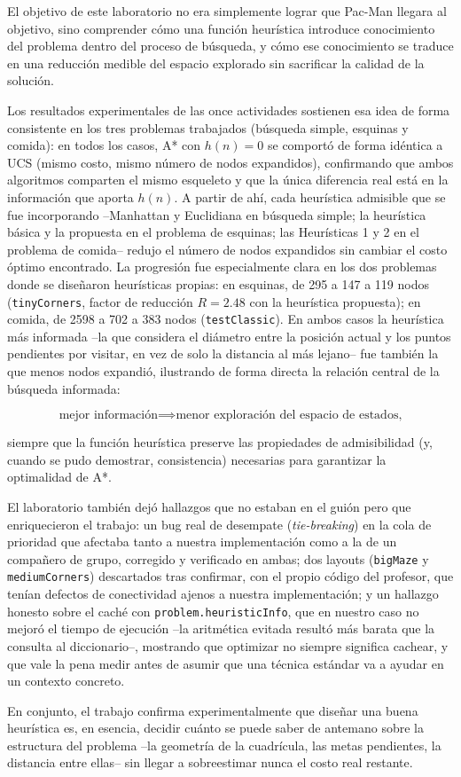El objetivo de este laboratorio no era simplemente lograr que Pac-Man llegara al objetivo, sino
comprender cómo una función heurística introduce conocimiento del problema dentro del proceso de
búsqueda, y cómo ese conocimiento se traduce en una reducción medible del espacio explorado sin
sacrificar la calidad de la solución.

Los resultados experimentales de las once actividades sostienen esa idea de forma consistente en
los tres problemas trabajados (búsqueda simple, esquinas y comida): en todos los casos, A* con
$h(n)=0$ se comportó de forma idéntica a UCS (mismo costo, mismo número de nodos expandidos),
confirmando que ambos algoritmos comparten el mismo esqueleto y que la única diferencia real está
en la información que aporta $h(n)$. A partir de ahí, cada heurística admisible que se fue
incorporando --Manhattan y Euclidiana en búsqueda simple; la heurística básica y la propuesta en el
problema de esquinas; las Heurísticas 1 y 2 en el problema de comida-- redujo el número de nodos
expandidos sin cambiar el costo óptimo encontrado. La progresión fue especialmente clara en los dos
problemas donde se diseñaron heurísticas propias: en esquinas, de 295 a 147 a 119 nodos
(\texttt{tinyCorners}, factor de reducción $R=2.48$ con la heurística propuesta); en comida, de 2598
a 702 a 383 nodos (\texttt{testClassic}). En ambos casos la heurística más informada --la que
considera el diámetro entre la posición actual y los puntos pendientes por visitar, en vez de solo
la distancia al más lejano-- fue también la que menos nodos expandió, ilustrando de forma directa la
relación central de la búsqueda informada:

$$\text{mejor información} \implies \text{menor exploración del espacio de estados,}$$

siempre que la función heurística preserve las propiedades de admisibilidad (y, cuando se pudo
demostrar, consistencia) necesarias para garantizar la optimalidad de A*.

El laboratorio también dejó hallazgos que no estaban en el guión pero que enriquecieron el trabajo:
un bug real de desempate (\textit{tie-breaking}) en la cola de prioridad que afectaba tanto a
nuestra implementación como a la de un compañero de grupo, corregido y verificado en ambas; dos
layouts (\texttt{bigMaze} y \texttt{mediumCorners}) descartados tras confirmar, con el propio código
del profesor, que tenían defectos de conectividad ajenos a nuestra implementación; y un hallazgo
honesto sobre el caché con \texttt{problem.heuristicInfo}, que en nuestro caso no mejoró el tiempo
de ejecución --la aritmética evitada resultó más barata que la consulta al diccionario--, mostrando
que optimizar no siempre significa cachear, y que vale la pena medir antes de asumir que una técnica
estándar va a ayudar en un contexto concreto.

En conjunto, el trabajo confirma experimentalmente que diseñar una buena heurística es, en esencia,
decidir cuánto se puede saber de antemano sobre la estructura del problema --la geometría de la
cuadrícula, las metas pendientes, la distancia entre ellas-- sin llegar a sobreestimar nunca el
costo real restante.
